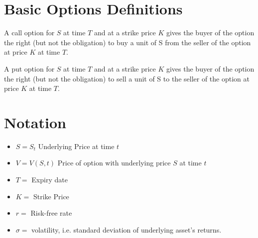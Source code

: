 \documentclass{article}
\begin{document}
		



\appendix
\section{Basic Options Definitions}
\begin{definition}
	A call option for $S$ at time $T$ and at a strike price $K$ gives the buyer of the option the right (but not the obligation) to buy a unit of S from the seller of the option at price $K$ at time $T$.
\end{definition}

\begin{definition}
	A put option for $S$ at time $T$ and at a strike price $K$ gives the buyer of the option the right (but not the obligation) to sell a unit of S to the seller of the option at price $K$ at time $T$.
\end{definition}



\section{Notation}
\begin{itemize}
		\item $S = S_{t}$ Underlying Price at time $t$
		\item $ V = V(S, t) $ Price of option with underlying price $ S $ at time $ t $
		\item $T = $ Expiry date  
		\item $K = $ Strike Price
		\item $r = $ Risk-free rate	
		\item $ \sigma = $ volatility, i.e. standard deviation of underlying asset's returns.
\end{itemize}	



 
\end{document}
